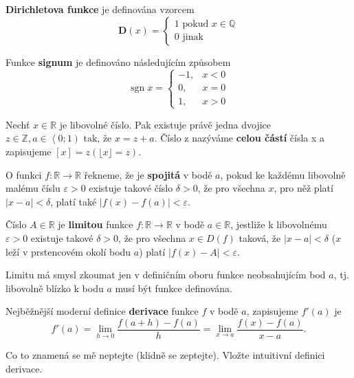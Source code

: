 \begin{definition}
  \textbf{Dirichletova funkce} je definována vzorcem
  $$\mathbf{D} (x) = \begin{cases}
1 \text{ pokud } x \in \mathbb Q \\
0 \text{ jinak }
  \end{cases}  $$
\end{definition}

\begin{definition}
  Funkce \textbf{signum} je definováno následujícím způsobem $$\operatorname {sgn} x={\begin{cases}-1,&x<0\\0,&x=0\\1,&x>0\end{cases}}$$
\end{definition}

\begin{definition}
  Nechť $x \in \mathbb{R}$ je libovolné číslo. Pak existuje právě jedna dvojice $z \in \mathbb{Z}, a \in \left \langle 0;1 \right) \text{ tak, že } x = z + a$.
Číslo z nazýváme \textbf{celou částí} čísla x a zapisujeme $[x] = z (\lfloor x \rfloor = z)$.
\end{definition}

\begin{definition}
  O funkci $f:\mathbb {R} \rightarrow \mathbb {R}$ řekneme, že je \textbf{spojitá} v bodě $a$, pokud ke každému libovolně malému číslu $\varepsilon >0$ existuje takové číslo $\delta >0$, že pro všechna $x$, pro něž platí $|x-a|<\delta$, platí také $|f(x)-f(a)|<\varepsilon$.
\end{definition}

\begin{definition}
  Číslo $A\in \mathbb {R}$ je \textbf{limitou} funkce $f:\mathbb {R} \rightarrow \mathbb {R}$ v bodě $ a\in \mathbb {R}$, jestliže k libovolnému $ \varepsilon >0$ existuje takové $ \delta >0$, že pro všechna $x\in D(f)$ taková, že $ \left|x-a\right|<\delta$ ($x$ leží v prstencovém okolí bodu $a$) platí $\left|f(x)-A\right|<\varepsilon $.

  Limitu má smysl zkoumat jen v definičním oboru funkce neobsahujícím bod $a$, tj. libovolně blízko k bodu $a$ musí být funkce definována.
\end{definition}

\begin{definition}
  Nejběžnější moderní definice \textbf{derivace} funkce $f$ v bodě $a$, zapisujeme $f'(a)$ je
  $$f'(a)=\lim _{h\to 0}{\frac {f(a+h)-f(a)}{h}}=\lim _{x\to a}{\frac {f(x)-f(a)}{x-a}}.$$

  Co to znamená se mě neptejte (klidně se zeptejte). Vložte intuitivní definici derivace.
\end{definition}

